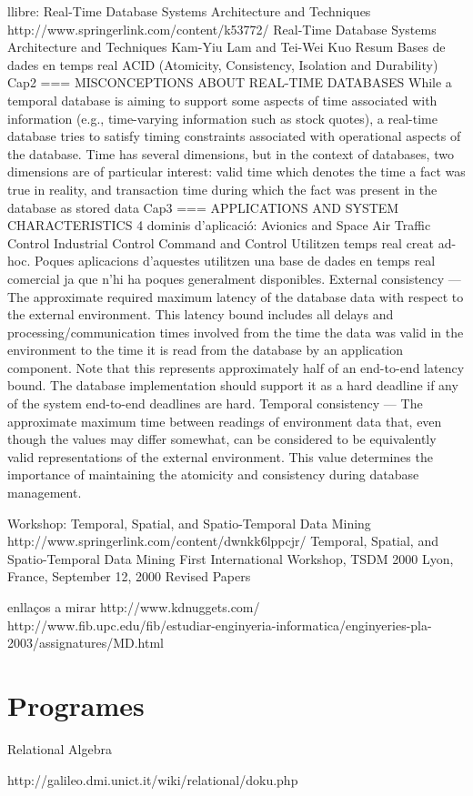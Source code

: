 llibre: Real-Time Database Systems Architecture and Techniques
​http://www.springerlink.com/content/k53772/
Real-Time Database Systems Architecture and Techniques
Kam-Yiu Lam and Tei-Wei Kuo
Resum
Bases de dades en temps real
ACID (Atomicity, Consistency, Isolation and Durability)
Cap2
===
MISCONCEPTIONS ABOUT REAL-TIME DATABASES
While a temporal database is aiming to support some aspects of time associated with information (e.g., time-varying information such as stock quotes), a real-time
database tries to satisfy timing constraints associated with operational aspects
of the database.
Time has several dimensions, but in the context of databases, two dimensions
are of particular interest: valid time which denotes the time a fact was true in
reality, and transaction time during which the fact was present in the database
as stored data
Cap3
===
APPLICATIONS AND SYSTEM CHARACTERISTICS
4 dominis d'aplicació:
Avionics and Space
Air Traffic Control
Industrial Control
Command and Control
Utilitzen temps real creat ad-hoc. Poques aplicacions d'aquestes utilitzen una base de dades en temps real comercial ja que n'hi ha poques generalment disponibles.
External consistency — The approximate required maximum latency
of the database data with respect to the external environment. This
latency bound includes all delays and processing/communication times
involved from the time the data was valid in the environment to the time
it is read from the database by an application component. Note that
this represents approximately half of an end-to-end latency bound. The
database implementation should support it as a hard deadline if any of
the system end-to-end deadlines are hard.
Temporal consistency — The approximate maximum time between
readings of environment data that, even though the values may differ
somewhat, can be considered to be equivalently valid representations
of the external environment. This value determines the importance of
maintaining the atomicity and consistency during database management.





Workshop: Temporal, Spatial, and Spatio-Temporal Data Mining
​http://www.springerlink.com/content/dwnkk6lppcjr/
Temporal, Spatial, and Spatio-Temporal Data Mining
First International Workshop, TSDM 2000 Lyon, France, September 12, 2000 Revised Papers


enllaços a mirar
​http://www.kdnuggets.com/
​http://www.fib.upc.edu/fib/estudiar-enginyeria-informatica/enginyeries-pla-2003/assignatures/MD.html



\section{Programes}

Relational Algebra

http://galileo.dmi.unict.it/wiki/relational/doku.php